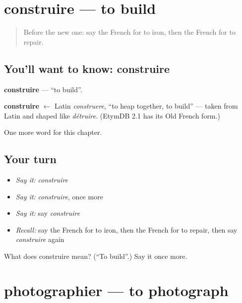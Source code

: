\section[construire]{construire — to build}

\label{lesson:FR-C233-construire}



\begin{quote}
Before the new one: say the French for to iron, then the French for to repair.
\end{quote}

\subsection*{You'll want to know: construire}
\textbf{construire} — \textquotedblleft{}to build\textquotedblright{}.

\begin{cousinweb}
\textbf{construire} $\leftarrow$ Latin \emph{construere}, \textquotedblleft{}to heap together, to build\textquotedblright{} — taken from Latin and shaped like \emph{détruire}. (EtymDB 2.1 has its Old French form.)
\end{cousinweb}

\begin{grammarlens}[title={What you've built}]
One more word for this chapter.
\end{grammarlens}

\subsection*{Your turn}
\begin{itemize}
\raggedright
  \item \emph{Say it:} \emph{construire}
  \item \emph{Say it:} \emph{construire}, once more
  \item \emph{Say it:} say \emph{construire}
  \item \emph{Recall:} say the French for to iron, then the French for to repair, then say \emph{construire} again
\end{itemize}

\begin{tcolorbox}[breakable,colback=teal!4,colframe=teal!35!black,title={Before you move on}]
What does construire mean? (\textquotedblleft{}To build\textquotedblright{}.) Say it once more.
\end{tcolorbox}
\section[photographier]{photographier — to photograph}


